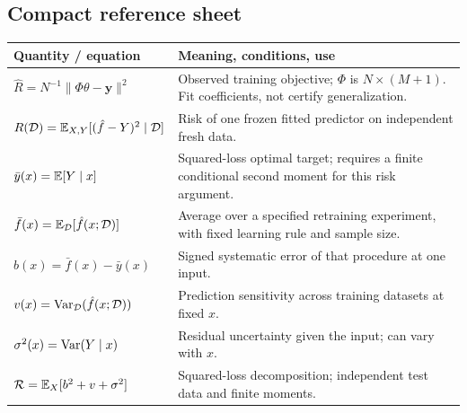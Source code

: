 \subsection*{Compact reference sheet}
\begin{center}\small
\begin{tabular}{p{.40\linewidth}p{.49\linewidth}}
\toprule Quantity / equation & Meaning, conditions, use\\\midrule
$\hat R=N^{-1}\|\Phi\theta-\mathbf y\|^2$ & Observed training objective; $\Phi$ is $N\times(M+1)$. Fit coefficients, not certify generalization.\\
$R(\mathcal D)=\mathbb{E}_{X,Y}[(\hat f-Y)^2\mid\mathcal D]$ & Risk of one frozen fitted predictor on independent fresh data.\\
$\bar y(x)=\mathbb{E}[Y\mid x]$ & Squared-loss optimal target; requires a finite conditional second moment for this risk argument.\\
$\bar f(x)=\mathbb{E}_{\mathcal D}[\hat f(x;\mathcal D)]$ & Average over a specified retraining experiment, with fixed learning rule and sample size.\\
$b(x)=\bar f(x)-\bar y(x)$ & Signed systematic error of that procedure at one input.\\
$v(x)=\operatorname{Var}_{\mathcal D}(\hat f(x;\mathcal D))$ & Prediction sensitivity across training datasets at fixed $x$.\\
$\sigma^2(x)=\operatorname{Var}(Y\mid x)$ & Residual uncertainty given the input; can vary with $x$.\\
$\mathcal R=\mathbb{E}_X[b^2+v+\sigma^2]$ & Squared-loss decomposition; independent test data and finite moments.\\\bottomrule
\end{tabular}
\end{center}
